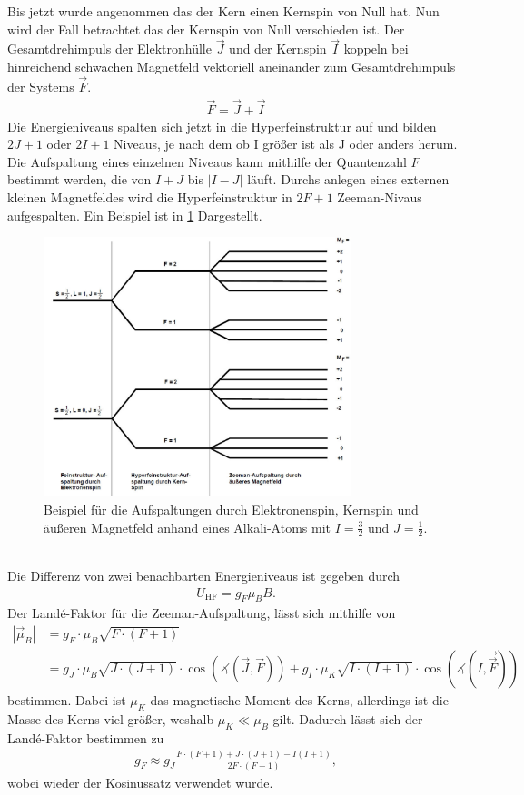 Bis jetzt wurde angenommen das der Kern einen Kernspin von Null hat.
Nun wird der Fall betrachtet das der Kernspin von Null verschieden ist.
Der Gesamtdrehimpuls der Elektronhülle $\vec{J}$ und der Kernspin $\vec{I}$ koppeln bei hinreichend schwachen Magnetfeld vektoriell aneinander zum Gesamtdrehimpuls der Systems $\vec{F}$.
\begin{align}
	\vec{F}=\vec{J}+\vec{I}
\end{align}
Die Energieniveaus spalten sich jetzt in die Hyperfeinstruktur auf und bilden $2J+1$ oder $2I+1$ Niveaus, je nach dem ob I größer ist als J oder anders herum.
Die Aufspaltung eines einzelnen Niveaus kann mithilfe der Quantenzahl $F$ bestimmt werden, die von $I+J$ bis $|I-J|$ läuft.
Durchs anlegen eines externen kleinen Magnetfeldes wird die Hyperfeinstruktur in $2F+1$ Zeeman-Nivaus aufgespalten.
Ein Beispiel ist in \cref{BeispielAufspaltung} Dargestellt.
\begin{figure}[h!]
	\centering
	\includegraphics[width = 0.8\textwidth]{../Grafiken/BeispielAlkali.pdf}
	\caption{Beispiel für die Aufspaltungen durch Elektronenspin, Kernspin und äußeren Magnetfeld anhand eines Alkali-Atoms mit $I=\frac{3}{2}$ und $J=\frac{1}{2}$.\cite{V21}}\label{BeispielAufspaltung}
\end{figure}\\
Die Differenz von zwei benachbarten Energieniveaus ist gegeben durch
\begin{align}
	U_\text{HF}=g_F\mu_BB.
\end{align}
Der Landé-Faktor für die Zeeman-Aufspaltung, lässt sich mithilfe von
\begin{align}
	|\vec{\mu}_B|&=g_F \cdot \mu_B \sqrt{F \cdot (F+1)}\\
	&=g_J \cdot \mu_B\sqrt{J \cdot (J+1)} \cdot \cos\left(\measuredangle(\vec{J},\vec{F})\right) + g_I \cdot \mu_K \sqrt{I\cdot(I+1)}\cdot \cos\left(\measuredangle(\vec{I,\vec{F}})\right)\nonumber
\end{align}
bestimmen. Dabei ist $\mu_K$ das magnetische Moment des Kerns, allerdings ist die Masse des Kerns viel größer, weshalb $\mu_K \ll \mu_B$ gilt. Dadurch lässt sich der Landé-Faktor bestimmen zu
\begin{align}
	g_F\approx g_J\frac{F\cdot(F+1)+J\cdot(J+1)-I(I+1)}{2F\cdot(F+1)},
	\label{eq:lande_faktor_gf}
\end{align}
wobei wieder der Kosinussatz verwendet wurde.

